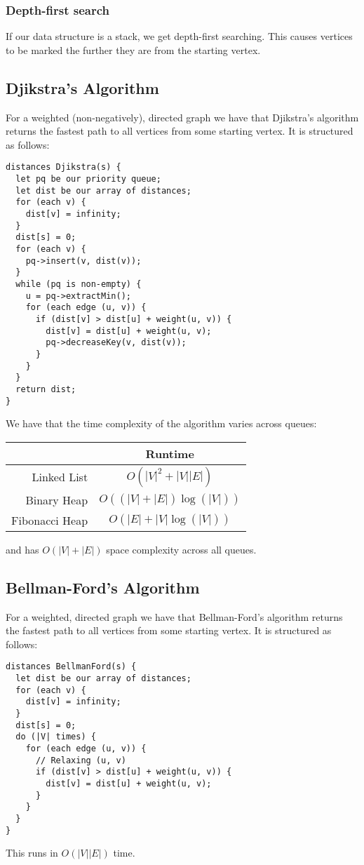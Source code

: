 \documentclass[a4paper, 12pt, twoside]{article}
\begin{document}
\subsubsection{Depth-first search}

If our data structure is a stack, we get depth-first searching.
This causes vertices to be marked the further they are from
the starting vertex.

\subsection{Djikstra's Algorithm}

For a weighted (non-negatively), directed graph we have that Djikstra's algorithm 
returns the fastest path to all vertices from some starting vertex. 
It is structured as follows: \begin{lstlisting}
distances Djikstra(s) {
  let pq be our priority queue;
  let dist be our array of distances;
  for (each v) {
    dist[v] = infinity;
  }
  dist[s] = 0;
  for (each v) {
    pq->insert(v, dist(v));
  }
  while (pq is non-empty) {
    u = pq->extractMin();
    for (each edge (u, v)) {
      if (dist[v] > dist[u] + weight(u, v)) {
        dist[v] = dist[u] + weight(u, v);
        pq->decreaseKey(v, dist(v));
      }
    }
  }
  return dist;
}
\end{lstlisting} We have that the time complexity of the algorithm
varies across queues: \begin{center}
  \begin{tabular} {| r || c |}
    \hline
    & Runtime \\
    \hline \hline
    Linked List & $O(|V|^2 + |V||E|)$ \\
    \hline
    Binary Heap & $O((|V| + |E|)\log{(|V|)})$ \\
    \hline
    Fibonacci Heap & $O(|E| + |V|\log{(|V|)})$ \\
    \hline
  \end{tabular}
\end{center}
and has $O(|V| + |E|)$ space complexity across all queues.

\subsection{Bellman-Ford's Algorithm}
For a weighted, directed graph we have that Bellman-Ford's algorithm 
returns the fastest path to all vertices from some starting vertex. 
It is structured as follows: \begin{lstlisting}
distances BellmanFord(s) {
  let dist be our array of distances;
  for (each v) {
    dist[v] = infinity;
  }
  dist[s] = 0;
  do (|V| times) {
    for (each edge (u, v)) {
      // Relaxing (u, v)
      if (dist[v] > dist[u] + weight(u, v)) {
        dist[v] = dist[u] + weight(u, v);
      }
    }
  }
}
\end{lstlisting} This runs in $O(|V||E|)$ time.
\end{document}
